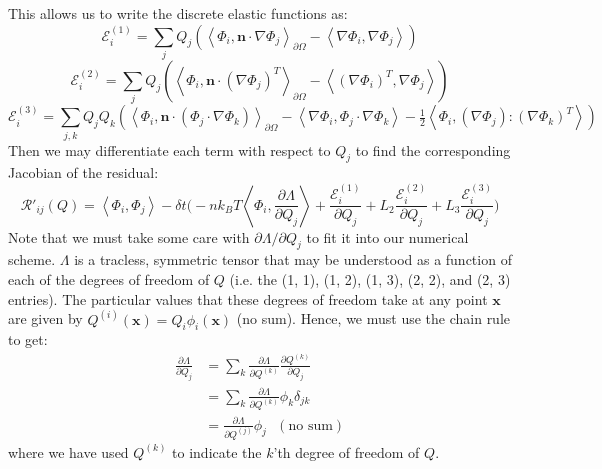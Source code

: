 \documentclass[reqno]{article}
\begin{document}
This allows us to write the discrete elastic functions as:
\begin{equation}
    \mathcal{E}^{(1)}_i
    = \sum_j Q_j \left( 
        \left< \Phi_i, \mathbf{n} \cdot \nabla \Phi_j \right>_{\partial \Omega}
        - \left< \nabla \Phi_i, \nabla \Phi_j \right>
    \right)
\end{equation}
\begin{equation}
    \mathcal{E}^{(2)}_i
    =
    \sum_j Q_j 
    \left(
    \left< \Phi_i, \mathbf{n} \cdot \left( \nabla \Phi_j \right)^T \right>_{\partial \Omega}
    - \left< \left( \nabla \Phi_i \right)^T, \nabla \Phi_j \right>
    \right)
\end{equation}
\begin{equation}
    \mathcal{E}^{(3)}_i
    =
    \sum_{j, k} Q_j Q_k 
    \left(
        \left< \Phi_i, \mathbf{n} \cdot \left( \Phi_j \cdot \nabla \Phi_k \right) \right>_{\partial \Omega}
        - \left< \nabla \Phi_i, \Phi_j \cdot \nabla \Phi_k \right> 
        - \tfrac12 \left< \Phi_i, \left( \nabla \Phi_j \right) : \left( \nabla \Phi_k \right)^T \right>
    \right)
\end{equation}
Then we may differentiate each term with respect to $Q_j$ to find the corresponding Jacobian of the residual:
\begin{equation}
    \mathcal{R}'_{ij}(Q)
    =
    \left<\Phi_i, \Phi_j\right>
    -
    \delta t \biggl(
        - n k_B T \left<\Phi_i, \frac{\partial \Lambda}{\partial Q_j} \right>
        + \frac{\mathcal{E}^{(1)}_i}{\partial Q_j}
        + L_2 \frac{\mathcal{E}^{(2)}_i}{\partial Q_j}
        + L_3 \frac{\mathcal{E}^{(3)}_i}{\partial Q_j}
    \biggr)
\end{equation}
Note that we must take some care with $\partial \Lambda / \partial Q_j$ to fit it into our numerical scheme.
$\Lambda$ is a tracless, symmetric tensor that may be understood as a function of each of the degrees of freedom of $Q$ (i.e. the (1, 1), (1, 2), (1, 3), (2, 2), and (2, 3) entries).
The particular values that these degrees of freedom take at any point $\mathbf{x}$ are given by $Q^{(i)} (\mathbf{x}) = Q_i \phi_i (\mathbf{x})$ (no sum).
Hence, we must use the chain rule to get:
\begin{equation}
    \begin{split}
        \frac{\partial \Lambda}{\partial Q_j}
        &= \sum_k \frac{\partial \Lambda}{\partial Q^{(k)}} \frac{\partial Q^{(k)}}{\partial Q_j} \\
        &= \sum_k \frac{\partial \Lambda}{\partial Q^{(k)}} \phi_k \delta_{jk} \\
        &= \frac{\partial \Lambda}{\partial Q^{(j)}} \phi_j \:\:\: (\text{no sum})
    \end{split}
\end{equation}
where we have used $Q^{(k)}$ to indicate the $k$'th degree of freedom of $Q$.
\end{document}
